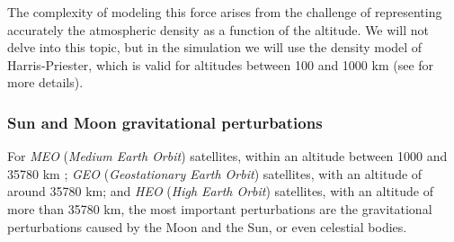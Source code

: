\documentclass[../main.tex]{subfiles}
\begin{document}
The complexity of modeling this force arises from the challenge of representing accurately the atmospheric density as a function of the altitude. We will not delve into this topic, but in the simulation we will use the density model of Harris-Priester, which is valid for altitudes between 100 and 1000 km (see \cite{montenbruck} for more details).

\subsubsection{Sun and Moon gravitational perturbations}
For \emph{MEO} (\emph{Medium Earth Orbit}) satellites, within an altitude between 1000 and 35780 km \cite{vallado}; \emph{GEO} (\emph{Geostationary Earth Orbit}) satellites, with an altitude of around 35780 km; and \emph{HEO} (\emph{High Earth Orbit}) satellites, with an altitude of more than 35780 km, the most important perturbations are the gravitational perturbations caused by the Moon and the Sun, or even celestial bodies.
\end{document}
